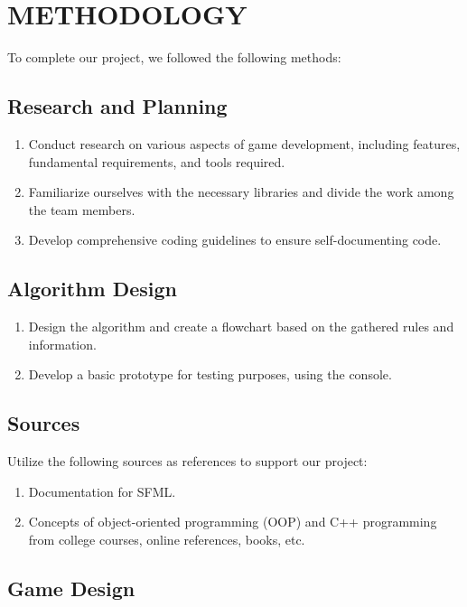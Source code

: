 
\section{METHODOLOGY}
To complete our project, we followed the following methods:


	\subsection{Research and Planning} 
	\begin{enumerate}
		\item  Conduct research on various aspects of game development, including features, fundamental requirements, and tools required.
		\item Familiarize ourselves with the necessary libraries and divide the work among the team members.
		\item Develop comprehensive coding guidelines to ensure self-documenting code.
		
	\end{enumerate}
	\subsection{Algorithm Design }
	\begin{enumerate}
		
		\item Design the algorithm and create a flowchart based on the gathered rules and information. 
		\item Develop a basic prototype for testing purposes, using the console.
		
		
	\end{enumerate}
	
 \subsection{Sources}
	Utilize the following sources as references to support our project:
	\begin{enumerate}
		
		\item Documentation for SFML.
		\item Concepts of object-oriented programming (OOP) and C++ programming from college courses, online references, books, etc.
		
		
	\end{enumerate}
	
	\subsection{Game Design}
	
